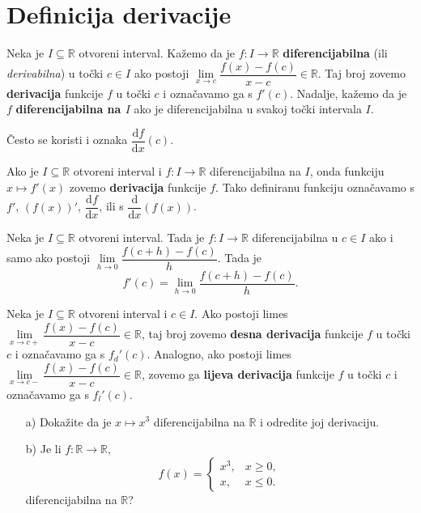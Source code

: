 \section{Definicija derivacije}
\begin{definition}
Neka je $I\subseteq \mathbb{R}$ otvoreni interval. Kažemo da je $f : I\to \mathbb{R}$ \textbf{diferencijabilna} (ili \textit{derivabilna}) u točki $c\in I$ ako postoji $\lim\limits_{x\to c}{\dfrac{f(x)-f(c)}{x-c}}\in \mathbb{R}$. Taj broj zovemo \textbf{derivacija} funkcije $f$ u točki $c$ i označavamo ga s $f'(c)$. Nadalje, kažemo da je $f$ \textbf{diferencijabilna na $I$} ako je diferencijabilna u svakoj točki intervala $I$.
\end{definition}
Često se koristi i oznaka $\dfrac{\mathrm{d}f}{\mathrm{d}x}(c)$.

Ako je $I\subseteq \mathbb{R}$ otvoreni interval i $f : I\to \mathbb{R}$ diferencijabilna na $I$, onda funkciju $x\mapsto f'(x)$ zovemo \textbf{derivacija} funkcije $f$. Tako definiranu funkciju označavamo s $f'$, $\left(f(x)\right)'$, $\dfrac{\mathrm{d}f}{\mathrm{d}x}$, ili s $\dfrac{\mathrm{d}}{\mathrm{d}x}\left(f(x)\right)$.
\begin{remark}
Neka je $I\subseteq \mathbb{R}$ otvoreni interval. Tada je $f : I\to \mathbb{R}$ diferencijabilna u $c\in I$ ako i samo ako postoji $\lim\limits_{h\to 0}{\dfrac{f(c+h)-f(c)}{h}}$. Tada je
$$f'(c)=\lim\limits_{h\to 0}{\dfrac{f(c+h)-f(c)}{h}}.$$
\end{remark}
\begin{definition} Neka je $I\subseteq \mathbb{R}$ otvoreni interval i $c\in I$. Ako postoji limes $\lim\limits_ {x\to c+}{\dfrac{f(x)-f(c)}{x-c}}\in \mathbb{R}$, taj broj zovemo \textbf{desna derivacija} funkcije $f$ u točki $c$ i označavamo ga s $f_d'(c)$. Analogno, ako postoji limes $\lim\limits_ {x\to c-}{\dfrac{f(x)-f(c)}{x-c}}\in \mathbb{R}$, zovemo ga \textbf{lijeva derivacija} funkcije $f$ u točki $c$ i označavamo ga s $f_l'(c)$.
\end{definition}
\begin{exercise} \textbf{}
\label{firstder}
\begin{itemize}
\item[a)] Dokažite da je $x\mapsto x^3$ diferencijabilna na $\mathbb{R}$ i odredite joj derivaciju.
\item[b)] Je li $f : \mathbb{R}\to \mathbb{R}$,
$$f(x)=\begin{cases}
x^3, & x\geq 0,\\
x, & x\leq 0.
\end{cases}$$
diferencijabilna na $\mathbb{R}$?
\end{itemize}
\end{exercise}
